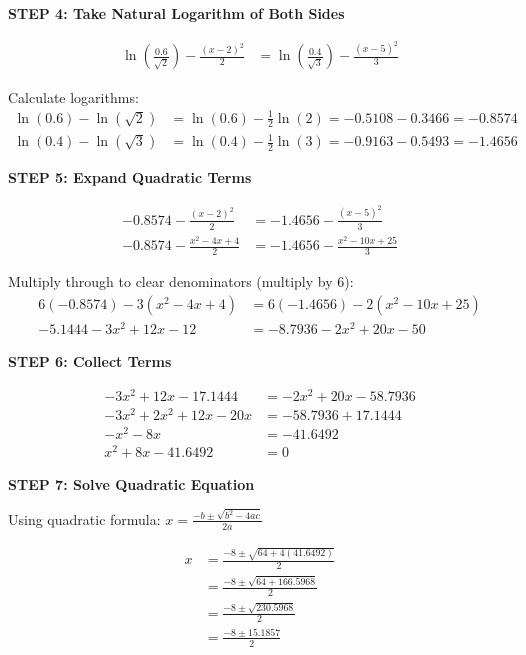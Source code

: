 \documentclass[12pt]{article}
\begin{document}
\begin{solution}
\textbf{STEP 4: Take Natural Logarithm of Both Sides}

\begin{align*}
\ln\left(\frac{0.6}{\sqrt{2}}\right) - \frac{(x-2)^2}{2} &= \ln\left(\frac{0.4}{\sqrt{3}}\right) - \frac{(x-5)^2}{3}
\end{align*}

Calculate logarithms:
\begin{align*}
\ln(0.6) - \ln(\sqrt{2}) &= \ln(0.6) - \frac{1}{2}\ln(2) = -0.5108 - 0.3466 = -0.8574 \\
\ln(0.4) - \ln(\sqrt{3}) &= \ln(0.4) - \frac{1}{2}\ln(3) = -0.9163 - 0.5493 = -1.4656
\end{align*}

\textbf{STEP 5: Expand Quadratic Terms}

\begin{align*}
-0.8574 - \frac{(x-2)^2}{2} &= -1.4656 - \frac{(x-5)^2}{3} \\
-0.8574 - \frac{x^2 - 4x + 4}{2} &= -1.4656 - \frac{x^2 - 10x + 25}{3}
\end{align*}

Multiply through to clear denominators (multiply by 6):
\begin{align*}
6(-0.8574) - 3(x^2 - 4x + 4) &= 6(-1.4656) - 2(x^2 - 10x + 25) \\
-5.1444 - 3x^2 + 12x - 12 &= -8.7936 - 2x^2 + 20x - 50
\end{align*}

\textbf{STEP 6: Collect Terms}

\begin{align*}
-3x^2 + 12x - 17.1444 &= -2x^2 + 20x - 58.7936 \\
-3x^2 + 2x^2 + 12x - 20x &= -58.7936 + 17.1444 \\
-x^2 - 8x &= -41.6492 \\
x^2 + 8x - 41.6492 &= 0
\end{align*}

\textbf{STEP 7: Solve Quadratic Equation}

Using quadratic formula: $x = \frac{-b \pm \sqrt{b^2 - 4ac}}{2a}$

\begin{align*}
x &= \frac{-8 \pm \sqrt{64 + 4(41.6492)}}{2} \\
&= \frac{-8 \pm \sqrt{64 + 166.5968}}{2} \\
&= \frac{-8 \pm \sqrt{230.5968}}{2} \\
&= \frac{-8 \pm 15.1857}{2}
\end{align*}


\end{solution}
\end{document}

